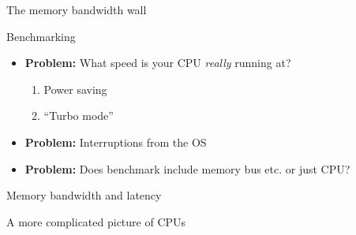 \documentclass[sans,mathserif]{beamer}
\begin{document}
\begin{frame}
  
  \begin{center}
    \Large The memory bandwidth wall
  \end{center}
\end{frame}

\begin{frame}{Benchmarking}

\begin{itemize}
\item<+-> {\bf Problem:} What speed is your CPU {\em really} running at?
  \begin{enumerate}
  \item Power saving
  \item ``Turbo mode''
  \end{enumerate}
\vspace{0.2cm}
\vspace{0.5cm}

\item<+-> {\bf Problem:} Interruptions from the OS\\
\vspace{0.2cm}
\vspace{0.5cm}

\item<+-> {\bf Problem:} Does benchmark include memory bus etc. or just CPU? \\
\end{itemize}

\end{frame}

\begin{frame}{Memory bandwidth and latency}
  
\end{frame}

\begin{frame}
  \begin{center}
    \LARGE A more complicated picture of CPUs
  \end{center}
\end{frame}
\end{document}
